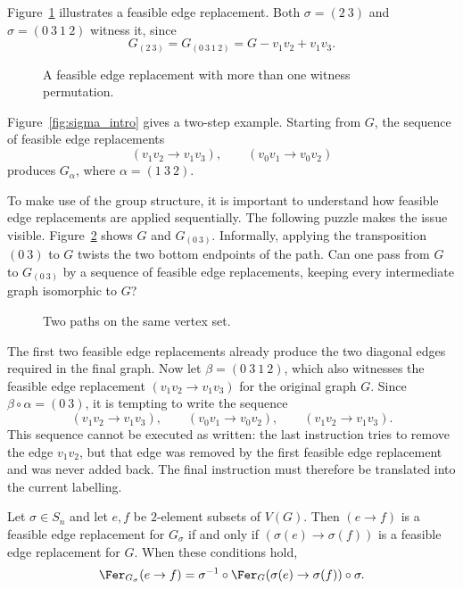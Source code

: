 Figure~\ref{fig:4_cycles_intro} illustrates a feasible edge replacement.
Both $\sigma=(2\ 3)$ and $\sigma=(0\ 3\ 1\ 2)$ witness it, since
\[
    G_{(2\ 3)}=G_{(0\ 3\ 1\ 2)}=G-v_1v_2+v_1v_3.
\]

\begin{figure}[htbp]
    \centering
    
    \caption{A feasible edge replacement with more than one witness permutation.}
    \label{fig:4_cycles_intro}
\end{figure}

Figure~\ref{fig:sigma_intro} gives a two-step example.
Starting from $G$, the sequence of feasible edge replacements
\[
    (v_1v_2\to v_1v_3),\qquad (v_0v_1\to v_0v_2)
\]
produces $G_\alpha$, where $\alpha=(1\ 3\ 2)$.

To make use of the group structure, it is important to understand how feasible edge replacements are applied sequentially.
The following puzzle makes the issue visible.
Figure~\ref{fig:4_paths} shows $G$ and $G_{(0\ 3)}$.
Informally, applying the transposition $(0\ 3)$ to $G$ twists the two bottom endpoints of the path.
Can one pass from $G$ to $G_{(0\ 3)}$ by a sequence of feasible edge replacements, keeping every intermediate graph isomorphic to $G$?

\begin{figure}[htbp]
    \centering
    
    \caption{Two paths on the same vertex set.}
    \label{fig:4_paths}
\end{figure}

The first two feasible edge replacements already produce the two diagonal edges required in the final graph.
Now let $\beta=(0\ 3\ 1\ 2)$, which also witnesses the feasible edge replacement $(v_1v_2\to v_1v_3)$ for the original graph $G$.
Since $\beta\circ\alpha=(0\ 3)$, it is tempting to write the sequence
\[
    (v_1v_2\to v_1v_3),\qquad
    (v_0v_1\to v_0v_2),\qquad
    (v_1v_2\to v_1v_3).
\]
This sequence cannot be executed as written: the last instruction tries to remove the edge $v_1v_2$, but that edge was removed by the first feasible edge replacement and was never added back.
The final instruction must therefore be translated into the current labelling.

\begin{proposition}\label{prop:concatenation-fer}
    Let $\sigma\in S_n$ and let $e,f$ be $2$-element subsets of $V(G)$.
    Then $(e\to f)$ is a feasible edge replacement for $G_\sigma$ if and only if $(\sigma(e)\to\sigma(f))$ is a feasible edge replacement for $G$.
    When these conditions hold,
    \[
        \Fer_{G_\sigma}(e\to f)
        =\sigma^{-1}\circ\Fer_G(\sigma(e)\to\sigma(f))\circ\sigma.
    \]
\end{proposition}

